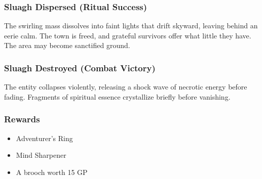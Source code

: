 \subsubsection*{Sluagh Dispersed (Ritual Success)}
{\entryfont The swirling mass dissolves into faint lights that drift skyward, leaving behind an eerie calm. The town is freed, and grateful survivors offer what little they have. The area may become sanctified ground.}
\subsubsection*{Sluagh Destroyed (Combat Victory)}
{\entryfont The entity collapses violently, releasing a shock wave of necrotic energy before fading. Fragments of spiritual essence crystallize briefly before vanishing.}
\subsubsection*{Rewards}
{\entryfont\begin{itemize}
	\item Adventurer's Ring
	\item Mind Sharpener
	\item A brooch worth 15 GP
\end{itemize}}